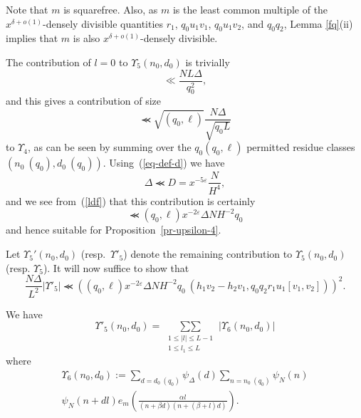 \documentclass[12pt,a4paper,reqno]{amsart}
\numberwithin{equation}{section}
\theoremstyle{plain}
\theoremstyle{definition}
\newcommand\eps{\varepsilon}
\newcommand\sumsum{\mathop{\sum\sum}\limits}
\renewcommand{\lessapprox}{\llcurly}
\begin{document}
Note that $m$ is squarefree. Also, as $m$ is the least common multiple of the $x^{\delta+o(1)}$-densely divisible
quantities $r_1$, $q_0 u_1v_1$, $q_0 u_1v_2$, and $q_0 q_2$, Lemma \ref{fq}(ii) implies that $m$ is also
$x^{\delta+o(1)}$-densely divisible.

The contribution of $l=0$ to $\Upsilon_5(n_0,d_0)$ is trivially
\begin{equation}\label{eq-l0}
  \ll \frac{NL\Delta}{q_0^2},
\end{equation}
and this gives a contribution of size
$$
\lessapprox \sqrt{(q_0,\ell)}\frac{N\Delta}{\sqrt{q_0L}}
$$
to $\Upsilon_4$, as can be seen by summing over the $q_0(q_0,\ell)$ permitted residue
classes $(n_0\ (q_0),d_0\ (q_0))$. Using~(\ref{eq-def-d}) we
have
$$
\Delta\lessapprox D=x^{-5\eps}\frac{N}{H^4},
$$
and we see from~(\ref{ldf}) that this contribution is certainly
$$
\lessapprox  (q_0,\ell)x^{-2\eps}\Delta
NH^{-2}q_0
$$
and hence suitable for Proposition~\ref{pr-upsilon-4}.  

Let $\Upsilon_5'(n_0,d_0)$ (resp.\ $\Upsilon'_5$) denote the remaining
contribution to $\Upsilon_5(n_0,d_0)$ (resp. $\Upsilon_5$). 
It will now suffice to show that
\begin{equation}\label{up5-p}
\frac{N\Delta}{L^2} | \Upsilon'_5|\lessapprox \left( (q_0,\ell)x^{-2\eps}\Delta
NH^{-2}q_0 \ \left(h_1v_2-h_2v_1,q_0q_2r_1u_1[v_1,v_2]\right) \right)^2.
\end{equation}

We have
\begin{equation}\label{eq-upsilonp-5}
  \Upsilon'_5(n_0,d_0)=  \sumsum_{\substack{1\leq |l|\leq L-1\\1\leq l_1
      \leq L}} |\Upsilon_6(n_0,d_0)|
\end{equation}
where
\begin{multline}\label{eq-upsilon-6}
  \Upsilon_6(n_0,d_0):=\sum_{d=d_0\ (q_0)} \psi_{\Delta}(d)
  \sum_{n=n_0\ (q_0)} \psi_N(n)\\
  \psi_N(n+dl)e_m\left(\frac{\alpha l}{(n+\beta d)(n+(\beta+l)d)}
  \right).
\end{multline}

 
\end{document}
